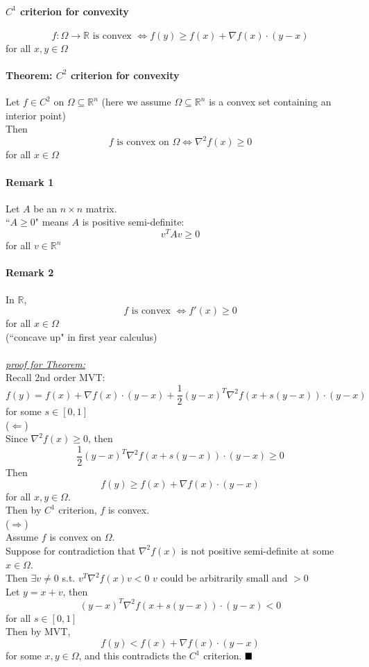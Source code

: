 \documentclass[11pt]{article}
\newcommand{\ti}[1]{\textit{#1}}
\newcommand{\real}[0]{\mathbb{R}}
\newcommand{\under}[1]{\underline{#1}}
\newcommand{\qed}[0]{$\hfill\blacksquare$}
\begin{document}
\paragraph{$C^1$ criterion for convexity}
$$f: \Omega \rightarrow \real \text{ is convex } \iff f(y) \geq f(x) + \nabla f(x) \cdot (y-x)$$
for all $x, y \in \Omega$

\paragraph{Theorem: $C^2$ criterion for convexity}
Let $f \in C^2$ on $\Omega \subseteq \real^n$ (here we assume $\Omega \subseteq \real^n$ is a convex set containing an interior point) \\
Then $$f \text{ is convex on } \Omega \iff \nabla^2 f(x) \geq 0$$ for all $x \in \Omega$


\paragraph{Remark 1}
Let $A$ be an $n \times n$ matrix.\\
``$A \geq 0$" means $A$ is positive semi-definite:
$$v^TAv \geq 0$$ for all $v \in \real^n$

\paragraph{Remark 2}
In $\real$, 
$$f \text{ is convex } \iff f'(x) \geq 0$$ for all $x \in \Omega$ \\
(``concave up" in first year calculus) \\\\
\ti{\under{proof for Theorem:}} \\
Recall 2nd order MVT: \\
$$f(y) = f(x) + \nabla f(x)\cdot (y-x) + \frac{1}{2}(y-x)^T \nabla^2 f(x+s(y-x))\cdot (y-x)$$
for some $s \in [0,1]$ \\
($\Leftarrow$) \\
Since $\nabla^2 f(x) \geq 0$, then 
$$\frac{1}{2}(y-x)^T \nabla^2 f(x+s(y-x))\cdot (y-x) \geq 0$$
Then
$$f(y) \geq f(x) + \nabla f(x) \cdot (y-x)$$
for all $x, y \in \Omega$. \\
Then by $C^1$ criterion,
$f$ is convex. \\
($\Rightarrow$) \\
Assume $f$ is convex on $\Omega$. \\
Suppose for contradiction that $\nabla^2 f(x)$ is not positive semi-definite at some $x \in \Omega$. \\
Then $\exists v \neq 0$ s.t. $v^T \nabla^2f(x) v < 0$
$v$ could be arbitrarily small and $>0$\\
Let $y = x + v$, then
$$(y-x)^T\nabla^2 f(x + s(y-x))\cdot (y-x) < 0$$
for all $s \in [0,1]$ \\
Then by MVT,
$$f(y) < f(x) + \nabla f(x)\cdot(y-x)$$
for some $x, y \in \Omega$, and this contradicts the $C^1$ criterion. \qed
\end{document}
